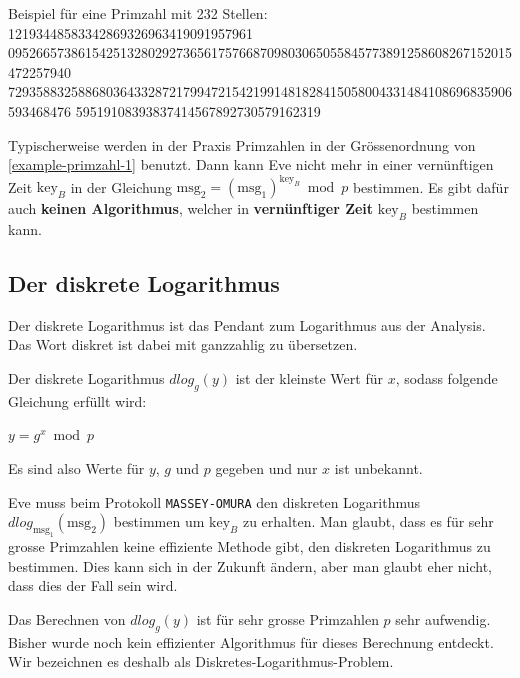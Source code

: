 \begin{example}
\label{example-primzahl-1}
Beispiel für eine Primzahl mit \num{232} Stellen: 12193448583342869326963419091957961
095266573861542513280292736561757668709803065055845773891258608267152015472257940
729358832588680364332872179947215421991481828415058004331484108696835906593468476
59519108393837414567892730579162319
\end{example}

Typischerweise werden in der Praxis Primzahlen in der Grössenordnung von \autoref{example-primzahl-1} benutzt. Dann kann Eve nicht mehr in einer vernünftigen Zeit $\text{key}_B$ in der Gleichung $\text{msg}_2 = (\text{msg}_1)^{\text{key}_B} \bmod p$ bestimmen. Es gibt dafür auch \textbf{keinen Algorithmus}, welcher in \textbf{vernünftiger Zeit} $\text{key}_B$ bestimmen kann.

\subsection{Der diskrete Logarithmus}

Der diskrete Logarithmus ist das Pendant zum Logarithmus aus der Analysis. Das Wort diskret ist dabei mit ganzzahlig zu übersetzen.

\begin{definition}
	Der diskrete Logarithmus $dlog_g(y)$ ist der kleinste Wert für $x$, sodass folgende Gleichung erfüllt wird:
	
\begin{center}
	$y = g^x \bmod p$
\end{center}

Es sind also Werte für $y$, $g$ und $p$ gegeben und nur $x$ ist unbekannt.
\end{definition}

Eve muss beim Protokoll \texttt{MASSEY-OMURA} den diskreten Logarithmus $dlog_{\text{msg}_1}(\text{msg}_2)$ bestimmen um $\text{key}_B$ zu erhalten. Man glaubt, dass es für sehr grosse Primzahlen keine effiziente Methode gibt, den diskreten Logarithmus zu bestimmen. Dies kann sich in der Zukunft ändern, aber man glaubt eher nicht, dass dies der Fall sein wird.

\begin{definition}
Das Berechnen von $dlog_g(y)$ ist für sehr grosse Primzahlen $p$ sehr aufwendig. Bisher wurde noch kein effizienter Algorithmus für dieses Berechnung entdeckt. Wir bezeichnen es deshalb als Diskretes-Logarithmus-Problem. 
\end{definition}

